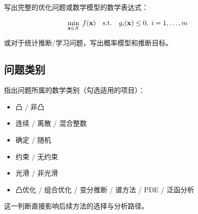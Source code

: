 写出完整的优化问题或数学模型的数学表达式：

\begin{equation}\label{eq:problem}
    \min_{\mathbf{x} \in \mathcal{X}} \; f(\mathbf{x}) \quad \text{s.t.} \quad g_i(\mathbf{x}) \leq 0,\; i = 1,\ldots,m
\end{equation}

或对于统计推断/学习问题，写出概率模型和推断目标。

\subsection{问题类别}

指出问题所属的数学类别（勾选适用的项目）：

\begin{itemize}
    \item 凸 / 非凸
    \item 连续 / 离散 / 混合整数
    \item 确定 / 随机
    \item 约束 / 无约束
    \item 光滑 / 非光滑
    \item 凸优化 / 组合优化 / 变分推断 / 谱方法 / PDE / 泛函分析
\end{itemize}

这一判断直接影响后续方法的选择与分析路径。
